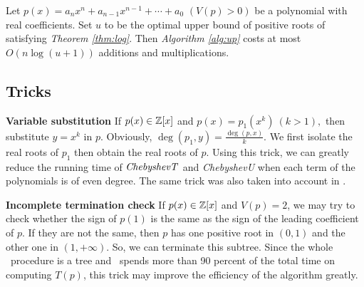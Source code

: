 \begin{corollary}
	Let $p(x)=a_nx^n+a_{n-1}x^{n-1}+\cdots+a_0$ $ (V(p)> 0)$ be a polynomial with real coefficients. Set $u$ to be the optimal upper bound of positive roots of  satisfying {\em Theorem
	\ref{thm:log}}. Then  {\em Algorithm \ref{alg:up}} costs at most $O(n\log(u+1))$  additions and multiplications.
\end{corollary}






\subsection{Tricks}
{\bf Variable substitution}
If $p(x)\in {\mathbb Z}[x]$ and $p(x)=p_1(x^k)\ (k>1),$ then substitute $y=x^k$ in $p$. Obviously, $\deg(p_1,y)=\frac{\deg(p,x)}{k}$. We first isolate the real roots of $p_1$ then
obtain the real roots of $p$. Using this trick, we can greatly reduce the running time of ${\it ChebyshevT}$
and {\it ChebyshevU} when each term of the polynomials is of even degree. The same trick was also taken into account in \cite{johnson06}.

{\bf Incomplete termination check}
If $p(x)\in {\mathbb Z}[x]$ and $V(p)= 2$, we may try to check whether the sign of $p(1)$ is the same as the sign of the leading coefficient of $p$. If they are not the same, then $p$  has one positive root in $(0,1)$ and the other one in $(1,+\infty)$. So, we can terminate this subtree. Since the whole \froot\ procedure is a tree and \froot\ spends more than 90 percent of the
total time on computing $T(p)$, this trick may improve the efficiency of the algorithm greatly.